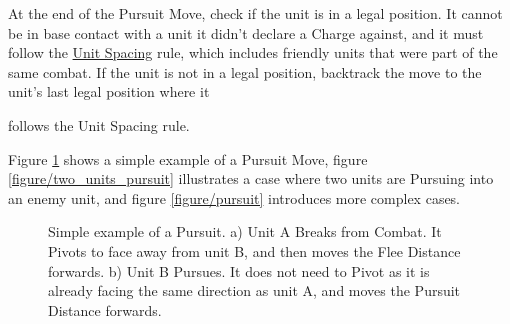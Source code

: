 At the end of the Pursuit Move, check if the unit is in a legal position. It cannot be in base contact with a unit it didn't declare a Charge against, and it must follow the \hyperref[unit_spacing]{Unit Spacing} rule, which includes friendly units that were part of the same combat. If the unit is not in a legal position, backtrack the move to the unit's last legal position where it {follows the Unit Spacing rule.

Figure \ref{figure/simple_pursuit} shows a simple example of a Pursuit Move, figure \ref{figure/two_units_pursuit} illustrates a case where two units are Pursuing into an enemy unit, and figure \ref{figure/pursuit} introduces more complex cases.

\newcommand{\figSimplePursA}{a)}
\newcommand{\figSimplePursB}{b)}

\begin{figure}[!htbp]
	\begin{minipage}{0.52\textwidth}
	\renewcommand{\figbiglettersize}{17}
	\def\svgwidth{\textwidth}
	
	\end{minipage}\hfill\begin{minipage}{0.45\textwidth}
	\caption{Simple example of a Pursuit.\captionpar
	a) Unit A Breaks from Combat. It Pivots to face away from unit B, and then moves the Flee Distance forwards.\captionpar
	b) Unit B Pursues. It does not need to Pivot as it is already facing the same direction as unit A, and moves the Pursuit Distance forwards.}
	\label{figure/simple_pursuit}
	\end{minipage}
\end{figure}


\newcommand{\figTwoPursA}{a)}
\newcommand{\figTwoPursB}{b)}
\newcommand{\figTwoPursC}{c)}
\newcommand{\figTwoPursOne}{\Largefontsize{}\textbf{1}}
\newcommand{\figTwoPursTwo}{\Largefontsize{}\textbf{2}}
\newcommand{\figTwoPursunitA}{\begin{minipage}{0.30\unitlength}\begin{center}\normalfontsize{}Pursuit Distance\par Unit A\end{center}\end{minipage}}
\newcommand{\figTwoPursunitB}{\begin{minipage}{0.30\unitlength}\begin{center}\normalfontsize{}Pursuit Distance\par Unit B\end{center}\end{minipage}}
\newcommand{\figTwoPursunitC}{\begin{minipage}{0.30\unitlength}\begin{center}\normalfontsize{}Pursuit Distance\par Unit C\end{center}\end{minipage}}
\newcommand{\figTwoPursunitD}{\begin{minipage}{0.30\unitlength}\begin{center}\normalfontsize{}Flee Distance\par Unit D\end{center}\end{minipage}}

}
